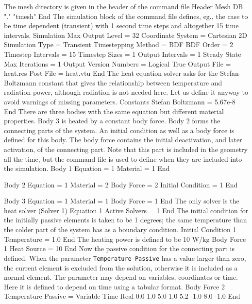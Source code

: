 The mesh directory is given in the header of the command file
%
\ttbegin
Header
  Mesh DB "." "tmesh"
End
\ttend
%
The simulation block of the command file defines, eg., the case to be time
dependent (transient) with 1 second time steps and altogether 15 time
intervals.  
%
\ttbegin
Simulation
  Max Output Level = 32
  Coordinate System = Cartesian 2D
  Simulation Type = Transient
  Timestepping Method = BDF
  BDF Order = 2
  Timestep Intervals = 15
  Timestep Sizes = 1
  Output Intervals = 1
  Steady State Max Iterations = 1
  Output Version Numbers = Logical True
  Output File = heat.res
  Post File = heat.vtu
End
\ttend
%
The heat equation solver asks for the Stefan-Boltzmann constant that
gives the relationship between temperature and radiation power,
although radiation is not needed here. Let us define it anyway to
avoid warnings of missing parameters.
%
\ttbegin
Constants
  Stefan Boltzmann = 5.67e-8
End
\ttend
%
There are three bodies with the same equation but different material
properties. Body 3 is heated by a constant body force. Body 2 forms
the connecting parts of the system. An initial condition as well as a
body force is defined for this body. The body force contains the
initial deactivation, and later activation, of the connecting
part. Note that this part is included in the geometry all the time,
but the command file is used to define when they are included into the
simulation.
%
\ttbegin
Body 1
  Equation = 1
  Material = 1
End

Body 2
  Equation = 1
  Material = 2
  Body Force = 2
  Initial Condition = 1
End

Body 3
  Equation = 1
  Material = 1
  Body Force = 1
End
\ttend
%
The only solver is the heat solver (Solver 1)
%
\ttbegin
Equation 1
  Active Solvers = 1
End
\ttend
%
The initial condition for the initially passive elements is taken to
be 1 degrees; the same temperature than the colder part of the system
has as a boundary condition.
%
\ttbegin
Initial Condition 1
  Temperature = 1.0
End
\ttend
%
The heating power is defined to be 10 W/kg
%
\ttbegin
Body Force 1
  Heat Source = 10
End
\ttend
%
Now the passive condition for the connecting part is defined. When the
parameter \texttt{Temperature Passive} has a value larger than zero,
the current element is excluded from the solution, otherwise it is
included as a normal element. The parameter may depend on variables,
coordinates or time. Here it is defined to depend on time using a
tabular format.
%
\ttbegin
Body Force 2
  Temperature Passive = Variable Time
    Real
      0.0    1.0
      5.0    1.0
      5.2   -1.0
      8.0   -1.0
    End


